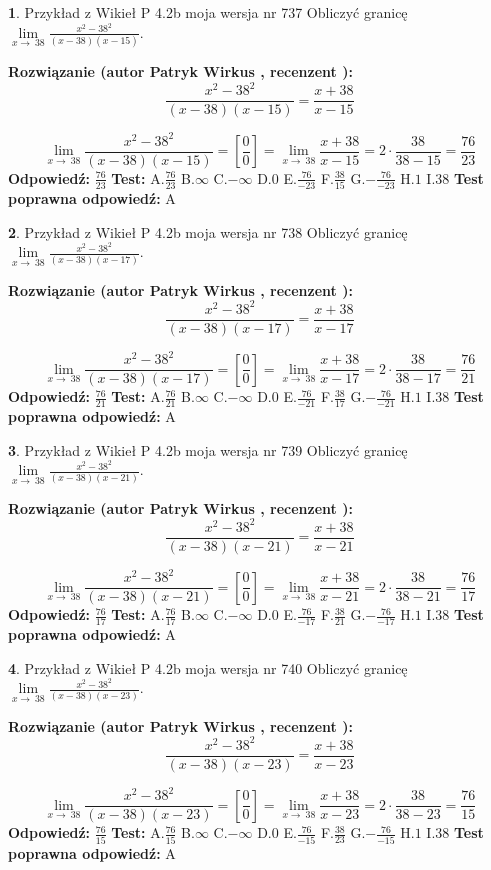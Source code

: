 \documentclass[12pt, a4paper]{article}
\theoremstyle{definition} %
\newtheorem{zad}{}
\newcommand{\zadStart}[1]{\begin{zad}#1\newline}
\newcommand{\zadStop}{\end{zad}}
\newcommand{\rozwStart}[2]{\noindent \textbf{Rozwiązanie (autor #1 , recenzent #2): }\newline}
\newcommand{\rozwStop}{\newline}
\newcommand{\odpStart}{\noindent \textbf{Odpowiedź:}\newline}
\newcommand{\odpStop}{\newline}
\newcommand{\testStart}{\noindent \textbf{Test:}\newline}
\newcommand{\testStop}{\newline}
\newcommand{\kluczStart}{\noindent \textbf{Test poprawna odpowiedź:}\newline}
\newcommand{\kluczStop}{\newline}
\begin{document}
\zadStart{Przykład z Wikieł P 4.2b moja wersja nr 737}
Obliczyć granicę $\lim\limits_{x\to\ 38}\frac{x^{2}-38^{2}}{(x-38)(x-15)}$.
\zadStop
\rozwStart{Patryk Wirkus}{}
$$\frac{x^{2}-38^{2}}{(x-38)(x-15)}=\frac{x+38}{x-15}$$

$$\lim\limits_{x\to\ 38}\frac{x^{2}-38^{2}}{(x-38)(x-15)}=[\frac{0}{0}]=\lim\limits_{x\to\ 38}\frac{x+38}{x-15}=2 \cdot \frac{38}{38-15} = \frac{76}{23}$$
\rozwStop
\odpStart
$\frac{76}{23}$
\odpStop
\testStart
A.$\frac{76}{23}$
B.$\infty$
C.$-\infty$
D.$0$
E.$\frac{76}{-23}$
F.$\frac{38}{15}$
G.$-\frac{76}{-23}$
H.$1$
I.$38$
\testStop
\kluczStart
A
\kluczStop



\zadStart{Przykład z Wikieł P 4.2b moja wersja nr 738}
Obliczyć granicę $\lim\limits_{x\to\ 38}\frac{x^{2}-38^{2}}{(x-38)(x-17)}$.
\zadStop
\rozwStart{Patryk Wirkus}{}
$$\frac{x^{2}-38^{2}}{(x-38)(x-17)}=\frac{x+38}{x-17}$$

$$\lim\limits_{x\to\ 38}\frac{x^{2}-38^{2}}{(x-38)(x-17)}=[\frac{0}{0}]=\lim\limits_{x\to\ 38}\frac{x+38}{x-17}=2 \cdot \frac{38}{38-17} = \frac{76}{21}$$
\rozwStop
\odpStart
$\frac{76}{21}$
\odpStop
\testStart
A.$\frac{76}{21}$
B.$\infty$
C.$-\infty$
D.$0$
E.$\frac{76}{-21}$
F.$\frac{38}{17}$
G.$-\frac{76}{-21}$
H.$1$
I.$38$
\testStop
\kluczStart
A
\kluczStop



\zadStart{Przykład z Wikieł P 4.2b moja wersja nr 739}
Obliczyć granicę $\lim\limits_{x\to\ 38}\frac{x^{2}-38^{2}}{(x-38)(x-21)}$.
\zadStop
\rozwStart{Patryk Wirkus}{}
$$\frac{x^{2}-38^{2}}{(x-38)(x-21)}=\frac{x+38}{x-21}$$

$$\lim\limits_{x\to\ 38}\frac{x^{2}-38^{2}}{(x-38)(x-21)}=[\frac{0}{0}]=\lim\limits_{x\to\ 38}\frac{x+38}{x-21}=2 \cdot \frac{38}{38-21} = \frac{76}{17}$$
\rozwStop
\odpStart
$\frac{76}{17}$
\odpStop
\testStart
A.$\frac{76}{17}$
B.$\infty$
C.$-\infty$
D.$0$
E.$\frac{76}{-17}$
F.$\frac{38}{21}$
G.$-\frac{76}{-17}$
H.$1$
I.$38$
\testStop
\kluczStart
A
\kluczStop



\zadStart{Przykład z Wikieł P 4.2b moja wersja nr 740}
Obliczyć granicę $\lim\limits_{x\to\ 38}\frac{x^{2}-38^{2}}{(x-38)(x-23)}$.
\zadStop
\rozwStart{Patryk Wirkus}{}
$$\frac{x^{2}-38^{2}}{(x-38)(x-23)}=\frac{x+38}{x-23}$$

$$\lim\limits_{x\to\ 38}\frac{x^{2}-38^{2}}{(x-38)(x-23)}=[\frac{0}{0}]=\lim\limits_{x\to\ 38}\frac{x+38}{x-23}=2 \cdot \frac{38}{38-23} = \frac{76}{15}$$
\rozwStop
\odpStart
$\frac{76}{15}$
\odpStop
\testStart
A.$\frac{76}{15}$
B.$\infty$
C.$-\infty$
D.$0$
E.$\frac{76}{-15}$
F.$\frac{38}{23}$
G.$-\frac{76}{-15}$
H.$1$
I.$38$
\testStop
\kluczStart
A
\kluczStop
\end{document}
